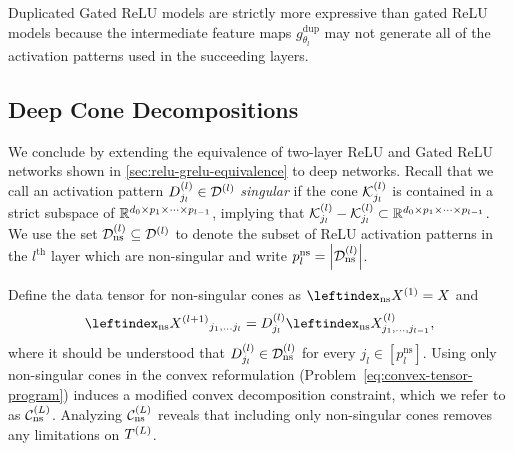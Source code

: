 Duplicated Gated ReLU models are strictly more expressive than gated ReLU
models because the intermediate feature maps \( g^{\text{dup}}_{\theta_{l}} \)
may not generate all of the activation patterns used in the succeeding layers.

\subsection{Deep Cone Decompositions}\label{sec:deep-cone-decompositions}

We conclude by extending the equivalence of two-layer ReLU and Gated ReLU networks
shown in \cref{sec:relu-grelu-equivalence} to deep networks.
Recall that we call an activation pattern \( D^{(l)}_{j_l} \in \mathcal{D}^{(l)} \)
\emph{singular} if the cone \( \mathcal{K}^{(l)}_{j_l} \)  is contained in a strict
subspace of \( \mathbb{R}^{d_0 \times p_1 \times \cdots \times p_{l-1}} \),
implying that
\( \mathcal{K}^{(l)}_{j_l} - \mathcal{K}^{(l)}_{j_l} \subset \mathbb{R}^{d_0 \times p_1 \times \cdots \times p_{l-1}} \).
We use the set \( \mathcal{D}^{(l)}_{\text{ns}} \subseteq \mathcal{D}^{(l)} \) to denote the subset
of ReLU activation patterns in the \( l^{\text{th}} \) layer which are
non-singular and write \( p^\text{ns}_{l} = \left\vert \mathcal{D}^{(l)}_{\text{ns}}\right\vert \).

Define the data tensor for non-singular cones as
\( \leftindex_{\text{ns}}{X}^{(1)} = X \)
and
\[
    \leftindex_{\text{ns}}{\Xll}_{j_1, \ldots j_l}
    = \Dl_{j_l} \leftindex_{\text{ns}}{X}^{(l)}_{j_1, \ldots, j_{l-1}},
\]
where it should be understood that \( D^{(l)}_{j_l} \in \mathcal{D}^{(l)}_{\text{ns}} \)
for every \( j_l \in [p_l^{\text{ns}}] \).
Using only non-singular cones in the convex reformulation
(Problem~\ref{eq:convex-tensor-program}) induces a modified convex
decomposition constraint, which we refer to as \( \mathcal{C}^{(L)}_{\text{ns}} \).
Analyzing \( \mathcal{C}^{(L)}_{\text{ns}} \) reveals that including only non-singular
cones removes any limitations on \( T^{(L)} \).

